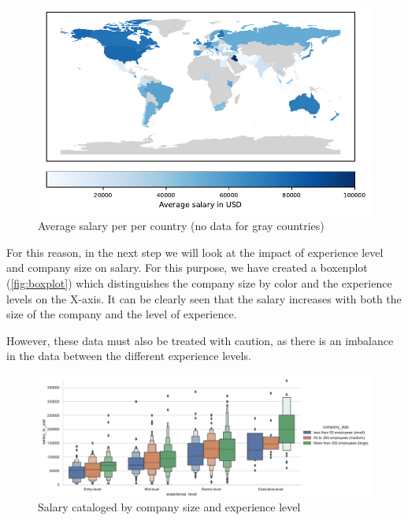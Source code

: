 \documentclass{article}
\begin{document}
\begin{figure}[h]
\centering
\caption{Average salary per per country (no data for gray countries)}
\label{fig:world_data_2}
\includegraphics[scale=0.85]{fig/world_salary_company_location.pdf}
\end{figure}

For this reason, in the next step we will look at the impact of experience level and company size on salary. For this purpose, we have created a boxenplot (\autoref{fig:boxplot}) which distinguishes the company size by color and the experience levels on the X-axis. It can be clearly seen that the salary increases with both the size of the company and the level of experience.

However, these data must also be treated with caution, as there is an imbalance in the data between the different experience levels. %

\begin{figure}[h]
\centering
\caption{Salary cataloged by company size and experience level}
\label{fig:boxplot}
\hspace*{-0.55cm}
\includegraphics[scale=0.5]{fig/experience_level.pdf}
\end{figure}
\end{document}
